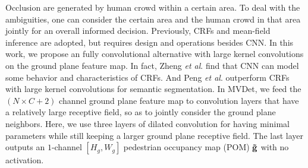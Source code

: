 \documentclass[runningheads]{llncs}
\newcommand{\etal}{\textit{et al}. }
\begin{document}
Occlusion are generated by human crowd within a certain area. To deal with the ambiguities, one can consider the certain area and the human crowd in that area jointly for an overall informed decision. 
Previously, CRFs and mean-field inference are adopted, but requires design and operations besides CNN. In this work, we propose an fully convolutional alternative with large kernel convolutions on the ground plane feature map. In fact, Zheng \etal \cite{zheng2015conditional} find that CNN can model some behavior and characteristics of CRFs. And Peng \etal \cite{peng2017large} outperform CRFs with large kernel convolutions for semantic segmentation. 
In MVDet, we feed the $\left(N\times C+2\right)$ channel ground plane feature map to convolution layers that have a relatively large receptive field, so as to jointly consider the ground plane neighbors. 
Here, we use three layers of dilated convolution for having minimal parameters while still keeping a larger ground plane receptive field. 
The last layer outputs an $1$-channel $\left[H_g,W_g\right]$ pedestrian occupancy map (POM) $\mathbf{\Tilde{g}}$ with no activation. 
\end{document}
